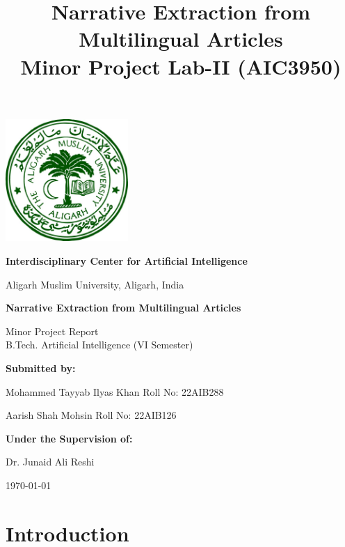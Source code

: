 \documentclass[12pt]{article}
\title{\Huge \bfseries Narrative Extraction from Multilingual Articles \\[1em] \large Minor Project Lab-II (AIC3950)}
\author{}
\date{}
\begin{document}
\begin{titlepage}
    \centering

    \includegraphics[width=0.35\textwidth]{images/amu_logo.jpg}\par
    \vspace{1em}
    {\large \bfseries Interdisciplinary Center for Artificial Intelligence \par}
    \vspace{0.5em}
    {\large Aligarh Muslim University, Aligarh, India\par}
    \vfill
    {\LARGE \bfseries Narrative Extraction from Multilingual Articles \par}
    \vspace{1cm}
    {\large Minor Project Report \\[0.3em]
    B.Tech. Artificial Intelligence (VI Semester)\par}
    \vfill


    {\large \bfseries Submitted by:\par}
    \vspace{0.5em}
    {\large Mohammed Tayyab Ilyas Khan \hfill Roll No: 22AIB288\par}
    {\large Aarish Shah Mohsin \hfill Roll No: 22AIB126\par}
    \vspace{1.5em}
    
    {\large \bfseries Under the Supervision of:\par}
    \vspace{0.5em}
    {\large Dr. Junaid Ali Reshi\par}

    \vfill
    {\large \today\par}
\end{titlepage}


\newpage
\tableofcontents
\newpage

\section{Introduction}
\end{document}
